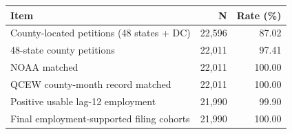 \begin{tabular}{lrr}
\toprule
Item & N & Rate (\%) \\
\midrule
County-located petitions (48 states + DC) & 22,596 & 87.02 \\
48-state county petitions & 22,011 & 97.41 \\
NOAA matched & 22,011 & 100.00 \\
QCEW county-month record matched & 22,011 & 100.00 \\
Positive usable lag-12 employment & 21,990 & 99.90 \\
Final employment-supported filing cohorts & 21,990 & 100.00 \\
\bottomrule
\end{tabular}
